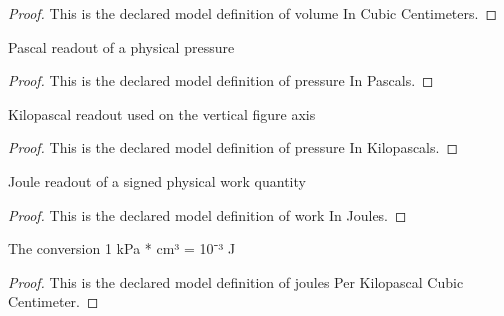 \begin{proof}
  This is the declared model definition of volume In Cubic Centimeters.
\end{proof}
\begin{definition}
  \label{def:physics:phyx-mini-0418:phyxminiproblems-problemphyxmini0418-pressureinpascals}
  Pascal readout of a physical pressure
\end{definition}
\begin{proof}
  This is the declared model definition of pressure In Pascals.
\end{proof}
\begin{definition}
  \label{def:physics:phyx-mini-0418:phyxminiproblems-problemphyxmini0418-pressureinkilopascals}
  Kilopascal readout used on the vertical figure axis
\end{definition}
\begin{proof}
  This is the declared model definition of pressure In Kilopascals.
\end{proof}
\begin{definition}
  \label{def:physics:phyx-mini-0418:phyxminiproblems-problemphyxmini0418-workinjoules}
  Joule readout of a signed physical work quantity
\end{definition}
\begin{proof}
  This is the declared model definition of work In Joules.
\end{proof}
\begin{definition}
  \label{def:physics:phyx-mini-0418:phyxminiproblems-problemphyxmini0418-joulesperkilopascalcubiccentimeter}
  The conversion 1 kPa * cm³ = 10⁻³ J
\end{definition}
\begin{proof}
  This is the declared model definition of joules Per Kilopascal Cubic Centimeter.
\end{proof}
